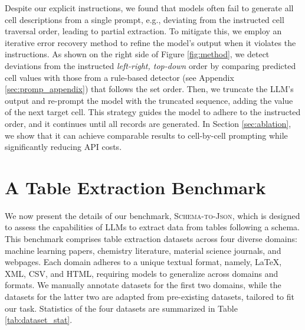 \documentclass[11pt]{article}
\newcommand\task{\textsc{Schema-to-Json}}
\begin{document}
Despite our explicit instructions, we found that models often fail to generate all cell descriptions from a single prompt, e.g., deviating from the instructed cell traversal order, leading to partial extraction.
To mitigate this, we employ an iterative error recovery method to refine the model's output when it violates the instructions. 
As shown on the right side of Figure \ref{fig:method}, we detect deviations from the instructed \textit{left-right, top-down} order by comparing predicted cell values with those from a rule-based detector (see Appendix \ref{sec:promp_appendix}) that follows the set order. Then, we truncate the LLM’s output and re-prompt the model with the truncated sequence, adding the value of the next target cell.
This strategy guides the model to adhere to the instructed order, and it continues until all records are generated.
In Section \ref{sec:ablation}, we show that it can achieve comparable results to cell-by-cell prompting while significantly reducing API costs.









\section{A Table Extraction Benchmark}
\label{sec:eval}

We now present the details of our benchmark, \task{}, which is designed to assess the capabilities of LLMs to extract data from tables following a schema. This benchmark comprises table extraction datasets across four diverse domains: machine learning papers, chemistry literature, material science journals, and webpages. Each domain adheres to a unique textual format, namely, \LaTeX, XML, CSV, and HTML, requiring models to generalize across domains and formats. We manually annotate datasets for the first two domains, while the datasets for the latter two are adapted from pre-existing datasets, tailored to fit our task. Statistics of the four datasets are summarized in Table \ref{tab:dataset_stat}. 
\end{document}
